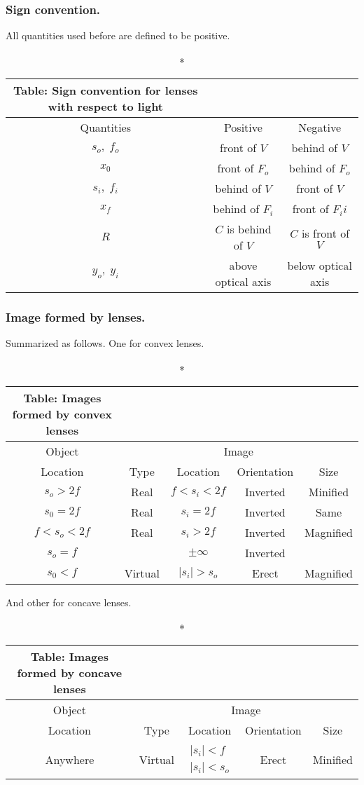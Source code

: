 \documentclass[../../../main.tex]{subfiles}
\begin{document}
\subsubsection*{Sign convention.} All quantities used before are defined to be positive.
\begin{longtable}{c | c | c}
    \caption*{Table: Sign convention for lenses with respect to light}\\
    \hline
    Quantities & Positive & Negative\\ 
    \hline\hline
    $s_o,\;f_o$& front of $V $ & behind of $V $ \\ 
    $x_0$& front of $F_o $ & behind of $F_o $\\
    $s_i,\;f_i$& behind of $V $ & front of $V $\\
    $x_f$& behind of $F_i $ & front of $F_ii $\\
    $R$& $C$ is behind of $V $ & $C$ is front of $V $\\
    $y_o,\;y_i$& above optical axis &below optical axis\\
    \hline
\end{longtable}

\subsubsection*{Image formed by lenses.} Summarized as follows. One for convex lenses.
\begin{longtable}{c | c | c | c | c}
    \caption*{Table: Images formed by convex lenses}\\
    \hline
    Object & \multicolumn{4}{c}{Image}\\
    \hline
    Location & Type & Location & Orientation & Size\\
    \hline\hline
    $s_o>2f$ &Real &$f<s_i<2f$ &Inverted &Minified \\
    $s_0=2f$ &Real &$s_i=2f$ &Inverted &Same \\
    $f<s_o<2f$ &Real &$s_i>2f$ &Inverted &Magnified \\
    $s_o=f$ & &$\pm \infty$ &Inverted & \\
    $s_0<f$ &Virtual &$|s_i|>s_o$ &Erect &Magnified \\
    \hline
\end{longtable}

And other for concave lenses.
\begin{longtable}{c | c | c | c | c}
    \caption*{Table: Images formed by concave lenses}\\
    \hline
    Object & \multicolumn{4}{c}{Image}\\
    \hline
    Location & Type & Location & Orientation & Size\\
    \hline\hline
    Anywhere &Virtual &$\begin{matrix}|s_i|<f \\|s_i|<s_o\end{matrix}$ &Erect &Minified \\
    \hline
\end{longtable}
\end{document}

